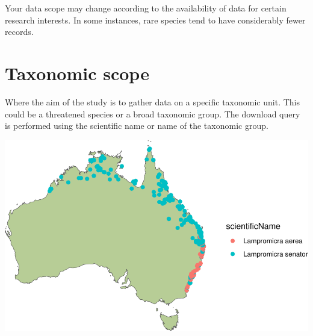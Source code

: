\documentclass[
  letterpaper,
  DIV=11,
  numbers=noendperiod,
  oneside]{scrreprt}
\begin{document}
Your data scope may change according to the availability of data for
certain research interests. In some instances, rare species tend to have
considerably fewer records.

\hypertarget{taxonomic-scope}{%
\section{Taxonomic scope}\label{taxonomic-scope}}

Where the aim of the study is to gather data on a specific taxonomic
unit. This could be a threatened species or a broad taxonomic group. The
download query is performed using the scientific name or name of the
taxonomic group.

\includegraphics{scope_files/figure-pdf/unnamed-chunk-1-1.pdf}
\end{document}
